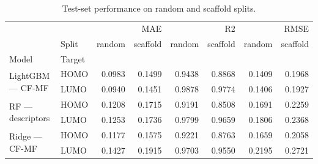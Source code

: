 \begin{table}
\caption{Test-set performance on random and scaffold splits.}
\label{tab:models}
\begin{tabular}{llrrrrrr}
\toprule
 &  & \multicolumn{2}{r}{MAE} & \multicolumn{2}{r}{R2} & \multicolumn{2}{r}{RMSE} \\
 & Split & random & scaffold & random & scaffold & random & scaffold \\
Model & Target &  &  &  &  &  &  \\
\midrule
\multirow[t]{2}{*}{LightGBM — CF-MF} & HOMO & 0.0983 & 0.1499 & 0.9438 & 0.8868 & 0.1409 & 0.1968 \\
 & LUMO & 0.0940 & 0.1451 & 0.9878 & 0.9774 & 0.1406 & 0.1927 \\
\cline{1-8}
\multirow[t]{2}{*}{RF — descriptors} & HOMO & 0.1208 & 0.1715 & 0.9191 & 0.8508 & 0.1691 & 0.2259 \\
 & LUMO & 0.1253 & 0.1736 & 0.9799 & 0.9659 & 0.1806 & 0.2368 \\
\cline{1-8}
\multirow[t]{2}{*}{Ridge — CF-MF} & HOMO & 0.1177 & 0.1575 & 0.9221 & 0.8763 & 0.1659 & 0.2058 \\
 & LUMO & 0.1427 & 0.1915 & 0.9703 & 0.9550 & 0.2195 & 0.2721 \\
\cline{1-8}
\bottomrule
\end{tabular}
\end{table}
